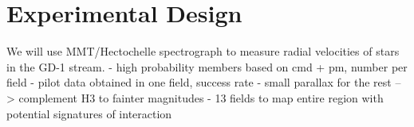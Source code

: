\documentclass[12pt]{article}
\begin{document}
%

\pagebreak
\section*{Experimental Design}\vskip-0.2in


We will use MMT/Hectochelle spectrograph to measure radial velocities of stars in the GD-1 stream.
- high probability members based on cmd + pm, number per field
- pilot data obtained in one field, success rate
- small parallax for the rest --> complement H3 to fainter magnitudes
- 13 fields to map entire region with potential signatures of interaction
\end{document}
